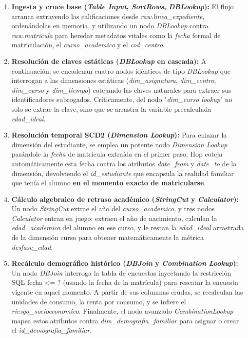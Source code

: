 \begin{enumerate}
    \item \textbf{Ingesta y cruce base (\textit{Table Input}, \textit{SortRows}, \textit{DBLookup}):} El flujo arranca extrayendo las calificaciones desde \textit{raw.linea\_expediente}, ordenándolas en memoria, y utilizando un nodo \textit{DBLookup} contra \textit{raw.matricula} para heredar metadatos vitales como la \textit{fecha} formal de matriculación, el \textit{curso\_academico} y el \textit{cod\_centro}.
    \item \textbf{Resolución de claves estáticas (\textit{DBLookup} en cascada):} A continuación, se encadenan cuatro nodos idénticos de tipo \textit{DBLookup} que interrogan a las dimensiones estáticas (\textit{dim\_asignatura}, \textit{dim\_centro}, \textit{dim\_curso} y \textit{dim\_tiempo}) cotejando las claves naturales para extraer sus identificadores subrogados. Críticamente, del nodo "\textit{dim\_curso lookup}" no solo se extrae la clave, sino que se arrastra la variable precalculada \textit{edad\_ideal}.
    \item \textbf{Resolución temporal SCD2 (\textit{Dimension Lookup}):} Para enlazar la dimensión del estudiante, se emplea un potente nodo \textit{Dimension Lookup} pasándole la \textit{fecha} de matrícula extraída en el primer paso. Hop coteja automáticamente esta fecha contra los atributos \textit{date\_from} y \textit{date\_to} de la dimensión, devolviendo el \textit{id\_estudiante} que encapsula la realidad familiar que tenía el alumno \textbf{en el momento exacto de matricularse}.
    \item \textbf{Cálculo algebraico de retraso académico (\textit{StringCut} y \textit{Calculator}):} Un nodo \textit{StringCut} extrae el año del \textit{curso\_academico}, y tres nodos \textit{Calculator} entran en juego: extraen el año de nacimiento, calculan la \textit{edad\_academica} del alumno en ese curso, y le restan la \textit{edad\_ideal} arrastrada de la dimensión curso para obtener matemáticamente la métrica \textit{desfase\_edad}.
    \item \textbf{Recálculo demográfico histórico (\textit{DBJoin} y \textit{Combination Lookup}):} Un nodo \textit{DBJoin} interroga la tabla de encuestas inyectando la restricción SQL fecha <= ? (usando la fecha de la matrícula) para rescatar la encuesta vigente en aquel momento. A partir de sus columnas crudas, se recalculan las unidades de consumo, la renta por consumo, y se infiere el \textit{riesgo\_socioeconomico}. Finalmente, el nodo avanzado \textit{CombinationLookup} mapea estos atributos contra \textit{dim\_demografia\_familiar} para asignar o crear el \textit{id\_demografia\_familiar}.

\end{enumerate}
